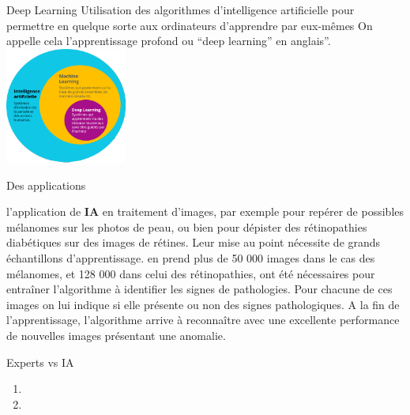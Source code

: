 \begin{frame}{Deep Learning}
    Utilisation des algorithmes d'intelligence artificielle pour permettre
    en quelque sorte aux ordinateurs d'apprendre par eux-mêmes On
    appelle cela l'apprentissage profond ou ``deep learning'' en anglais''.\mybox
    \\
    \bigskip
    \bigskip
    \centering
    \includegraphics[height=0.3\textwidth,width=0.3\textwidth]{ai1a.png}
\end{frame}

\begin{frame}{Des applications}
    \begin{enumerate}[<+-|alert@+>]
        \myitem
        l'application de \textbf{IA} en traitement d'images, par exemple pour repérer de
        possibles mélanomes sur les photos de peau, ou bien pour dépister des
        rétinopathies diabétiques sur des images de rétines. Leur mise au point
        nécessite de grands échantillons d'apprentissage.
        \myitem
        en prend plus de 50 000 images dans le cas des mélanomes, et 128 000
        dans celui des rétinopathies, ont été nécessaires pour entraîner
        l'algorithme à identifier les signes de pathologies. Pour chacune
        de ces images on lui indique si elle présente ou non des signes
        pathologiques.
        \myitem
        A la fin de l'apprentissage, l'algorithme arrive à
        reconnaître avec une excellente performance de nouvelles images
            présentant une anomalie. \mybox
    \end{enumerate}
\end{frame}


\begin{frame}{Experts  vs IA}
    \begin{enumerate}[]
        \item {}

        \item {}
            \vspace{80mm}
    \end{enumerate}
\end{frame}
